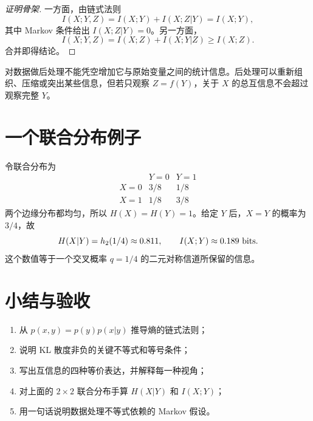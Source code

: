 \begin{proof}[证明骨架]
一方面，由链式法则
\[
I(X;Y,Z)=I(X;Y)+I(X;Z|Y)=I(X;Y),
\]
其中 Markov 条件给出 $I(X;Z|Y)=0$。另一方面，
\[
I(X;Y,Z)=I(X;Z)+I(X;Y|Z)\ge I(X;Z).
\]
合并即得结论。
\end{proof}

\begin{intuitionbox}
对数据做后处理不能凭空增加它与原始变量之间的统计信息。后处理可以重新组织、压缩或突出某些信息，但若只观察 $Z=f(Y)$，关于 $X$ 的总互信息不会超过观察完整 $Y$。
\end{intuitionbox}

\section{一个联合分布例子}

令联合分布为
\[
\begin{array}{c|cc}
 &Y=0&Y=1\\\hline
X=0&3/8&1/8\\
X=1&1/8&3/8
\end{array}
\]
两个边缘分布都均匀，所以 $H(X)=H(Y)=1$。给定 $Y$ 后，$X=Y$ 的概率为 $3/4$，故
\[
H(X|Y)=h_2(1/4)\approx0.811,
\qquad
I(X;Y)\approx0.189\text{ bits}.
\]
这个数值等于一个交叉概率 $q=1/4$ 的二元对称信道所保留的信息。

\section{小结与验收}

\begin{checkpointbox}
\begin{enumerate}
  \item 从 $p(x,y)=p(y)p(x|y)$ 推导熵的链式法则；
  \item 说明 KL 散度非负的关键不等式和等号条件；
  \item 写出互信息的四种等价表达，并解释每一种视角；
  \item 对上面的 $2\times2$ 联合分布手算 $H(X|Y)$ 和 $I(X;Y)$；
  \item 用一句话说明数据处理不等式依赖的 Markov 假设。
\end{enumerate}
\end{checkpointbox}
